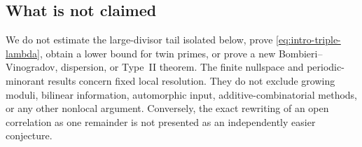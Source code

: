 \subsection*{What is not claimed}

We do not estimate the large-divisor tail isolated below, prove
\eqref{eq:intro-triple-lambda}, obtain a lower bound for twin primes, or prove
a new Bombieri--Vinogradov, dispersion, or Type~II theorem.  The finite
nullspace and periodic-minorant results concern fixed local resolution.  They
do not exclude growing moduli, bilinear information, automorphic input,
additive-combinatorial methods, or any other nonlocal argument.  Conversely,
the exact rewriting of an open correlation as one remainder is not presented
as an independently easier conjecture.
